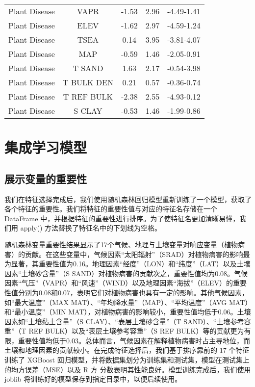 \documentclass[AutoFakeBold]{LZUThesis-PgD&PhD}
\begin{document}
\begin{table}[H]
\begin{tabular}{ccccc}
			Plant Disease & VAPR & -1.53 & 2.96 & -4.49-1.41 \\ 
			Plant Disease & ELEV & -1.62 & 2.97 & -4.59-1.24 \\ 
			Plant Disease & TSEA & 0.14 & 3.95 & -3.81-4.07 \\ 
			Plant Disease & MAP & -0.59 & 1.46 & -2.05-0.91 \\ 
			Plant Disease & T SAND & 1.63 & 2.17 & -0.54-3.98 \\ 
			Plant Disease & T BULK DEN & 0.21 & 0.57 & -0.36-0.74 \\ 
			Plant Disease & T REF BULK & -2.38 & 2.55 & -4.93-0.12 \\ 
			Plant Disease & S CLAY & -0.53 & 1.46 & -1.99-0.86 \\ 
			\hline
		\end{tabular}
		
	\end{table}
	
	
	
%		
%		
	\section{集成学习模型}
	
	\subsection{展示变量的重要性}
	我们在特征选择完成后，我们使用随机森林回归模型重新训练了一个模型，获取了各个特征的重要性。我们将特征的重要性值与对应的特征名存储在一个 DataFrame 中，并根据特征的重要性进行排序。为了使特征名更加清晰易懂，我们用 apply() 方法替换了特征名中的下划线为空格。
	
	随机森林变量重要性结果显示了17个气候、地理与土壤变量对响应变量（植物病害）的贡献。在这些变量中，气候因素“太阳辐射”（SRAD）对植物病害的影响最为显著，其重要性值为0.16。地理因素“经度”（LON）和“纬度”（LAT）以及土壤因素“土壤砂含量”（S SAND）对植物病害的贡献次之，重要性值均为0.08。气候因素“气压”（VAPR）和“风速”（WIND）以及地理因素“海拔”（ELEV）的重要性值分别为0.08和0.07，表明它们对植物病害也具有一定的影响。其他气候因素，如“最大温度”（MAX MAT）、“年均降水量”（MAP）、“平均温度”（AVG MAT）和“最小温度”（MIN MAT），对植物病害的影响较小，重要性值均低于0.06。土壤因素如“土壤黏土含量”（S CLAY）、“表层土壤砂含量”（T SAND）、“土壤参考容重”（T REF BULK）以及“表层土壤参考容重”（S REF BULK）等的贡献更为有限，重要性值均低于0.03。总体而言，气候因素在解释植物病害时占主导地位，而土壤和地理因素的贡献较小。在完成特征选择后，我们基于排序靠前的 17 个特征训练了 XGBoost 回归模型，并将数据集划分为训练集和测试集，模型在测试集上的均方误差（MSE）以及 R 方 分数表明其性能良好。模型训练完成后，我们使用 joblib 将训练好的模型保存到指定目录中，以便后续使用。
	
\end{document}
